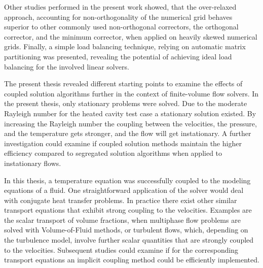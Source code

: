 Other studies performed in the present work showed, that the over-relaxed approach, accounting for non-orthogonality of the numerical grid behaves superior to other commonly used non-orthogonal correctors, the orthogonal corrector, and the minimum corrector, when applied on heavily skewed numerical grids.  Finally, a simple load balancing technique, relying on automatic matrix partitioning was presented, revealing the potential of achieving ideal load balancing for the involved linear solvers.

The present thesis revealed different starting points to examine the effects of coupled solution algorithms further in the context of finite-volume flow solvers. In the present thesis, only stationary problems were solved. Due to the moderate Rayleigh number for the heated cavity test case a stationary solution existed. By increasing the Rayleigh number the coupling between the velocities, the pressure, and the temperature gets stronger, and the flow will get instationary. A further investigation could examine if coupled solution methods maintain the higher efficiency compared to segregated solution algorithms when applied to instationary flows.

In this thesis, a temperature equation was successfully coupled to the modeling equations of a fluid. One straightforward application of the solver would deal with conjugate heat transfer problems. In practice there exist other similar transport equations that exhibit strong coupling to the velocities. Examples are the scalar transport of volume fractions, when multiphase flow problems are solved with Volume-of-Fluid methods, or turbulent flows, which, depending on the turbulence model, involve further scalar quantities that are strongly coupled to the velocities. Subsequent studies could examine if for the corresponding transport equations an implicit coupling method could be efficiently implemented.

